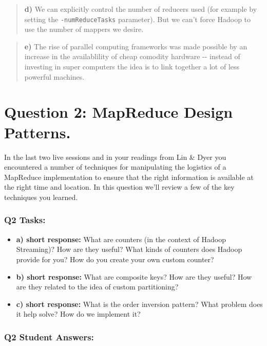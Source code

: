 \documentclass[11pt]{article}
\begin{document}
\begin{quote}
\textbf{d)} We can explicitly control the number of reducers used (for
example by setting the \texttt{-numReduceTasks} parameter). But we can't
force Hadoop to use the number of mappers we desire.
\end{quote}

\begin{quote}
\textbf{e)} The rise of parallel computing frameworks was made possible
by an increase in the availablility of cheap comodity hardware -\/-
instead of investing in super computers the idea is to link together a
lot of less powerful machines.
\end{quote}

    \section{Question 2: MapReduce Design
Patterns.}\label{question-2-mapreduce-design-patterns.}

In the last two live sessions and in your readings from Lin \& Dyer you
encountered a number of techniques for manipulating the logistics of a
MapReduce implementation to ensure that the right information is
available at the right time and location. In this question we'll review
a few of the key techniques you learned.

\subsubsection{Q2 Tasks:}\label{q2-tasks}

\begin{itemize}
\item
  \textbf{a) short response:} What are counters (in the context of
  Hadoop Streaming)? How are they useful? What kinds of counters does
  Hadoop provide for you? How do you create your own custom counter?
\item
  \textbf{b) short response:} What are composite keys? How are they
  useful? How are they related to the idea of custom partitioning?
\item
  \textbf{c) short response:} What is the order inversion pattern? What
  problem does it help solve? How do we implement it?
\end{itemize}

    \subsubsection{Q2 Student Answers:}\label{q2-student-answers}
\end{document}
